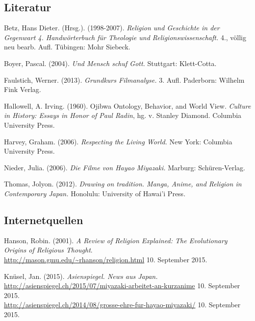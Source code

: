 \documentclass[a4paper]{article}
\begin{document}
\newpage
\renewcommand\refname{Bibliographie}
\begin{thebibliography}{9}

\subsection*{Literatur}

	Betz, Hans Dieter. (Hrsg.). (1998-2007).
	\emph{Religion und Geschichte in der Gegenwart 4. Handwörterbuch für Theologie und Religionswissenschaft.} 4., völlig neu bearb. Aufl. Tübingen: Mohr Siebeck.

	Boyer, Pascal.
	(2004).
	\emph{Und Mensch schuf Gott.}
	Stuttgart: Klett-Cotta.

	Faulstich, Werner.
	(2013).
	\emph{Grundkurs Filmanalyse.} 
	3. Aufl. 
	Paderborn: Wilhelm Fink Verlag.

	Hallowell, A. Irving. (1960). \glqq Ojibwa Ontology, Behavior, and World View\grqq. \emph{Culture in History: Essays in Honor of Paul Radin}, hg. v. Stanley Diamond. Columbia University Press. 

	Harvey, Graham.
	(2006).
	\emph{Respecting the Living World.}
	New York: Columbia University Press.

	Nieder, Julia. 
	(2006). 
	\emph{Die Filme von Hayao Miyazaki.}
	Marburg: Schüren-Verlag.

	Thomas, Jolyon.
	(2012).
	\emph{Drawing on tradition. Manga, Anime, and Religion in Contemporary Japan.}
	Honolulu: University of Hawai'i Press.

\subsection*{Internetquellen}

	Hanson, Robin. (2001). \emph{A Review of Religion Explained: The Evolutionary Origins of Religious Thought}. \\ \url{http://mason.gmu.edu/~rhanson/religion.html} 10. September 2015.

	Knüsel, Jan. (2015). \emph{Asienspiegel. News aus Japan.}\\ \url{http://asienspiegel.ch/2015/07/miyazaki-arbeitet-an-kurzanime} 10. September 2015.\\ \url{http://asienspiegel.ch/2014/08/grosse-ehre-fur-hayao-miyazaki/} 10. September 2015.


\end{thebibliography}
\end{document}
